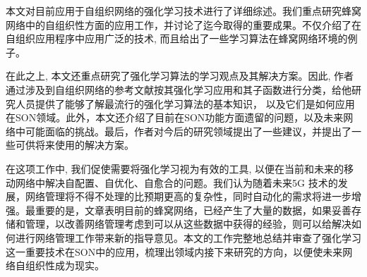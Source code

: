 \documentclass{IEEEtran}
\begin{document}
本文对目前应用于自组织网络的强化学习技术进行了详细综述。我们重点研究蜂窝网络中的自组织性方面的应用工作，并讨论了迄今取得的重要成果。不仅介绍了在自组织应用程序中应用广泛的技术, 而且给出了一些学习算法在蜂窝网络环境的例子。

在此之上, 本文还重点研究了强化学习算法的学习观点及其解决方案。因此, 作者通过涉及到自组织网络的参考文献按其强化学习应用和其子函数进行分类，给他研究人员提供了能够了解最流行的强化学习算法的基本知识， 以及它们是如何应用在SON领域。此外，本文还介绍了目前在SON功能方面遗留的问题，以及未来网络中可能面临的挑战。最后，作者对今后的研究领域提出了一些建议，并提出了一些可供将来使用的解决方案。

在这项工作中, 我们促使需要将强化学习视为有效的工具, 以便在当前和未来的移动网络中解决自配置、自优化、自愈合的问题。我们认为随着未来5G 技术的发展，网络管理将不得不处理的比预期更高的复杂性，同时自动化的需求将进一步增强。最重要的是，文章表明目前的蜂窝网络，已经产生了大量的数据，如果妥善存储和管理，以改善网络管理考虑到可以从这些数据中获得的经验，则可以给解决如何进行网络管理工作带来新的指导意见。本文的工作完整地总结并审查了强化学习这一重要技术在SON中的应用，梳理出领域内接下来研究的方向，以便使未来网络自组织性成为现实。




\end{document}

